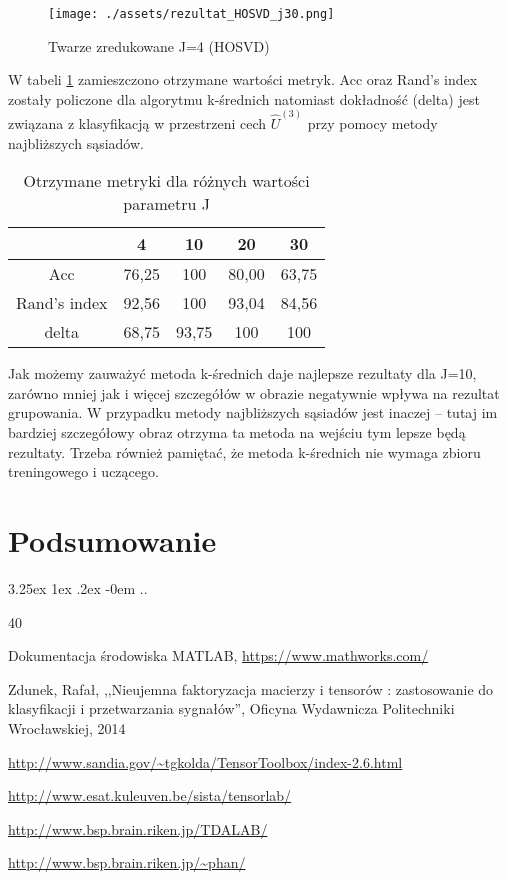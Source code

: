 \documentclass[11pt, a4paper]{article}
\makeatletter
\newcommand{\fbi}{\leavevmode{\parindent=1em\indent}}
\renewcommand\paragraph{\@startsection{paragraph}{5}{\z@}
  {3.25ex \@plus1ex \@minus.2ex}
  {-0em}
  {\normalfont\normalsize\bfseries}}
\makeatother
\begin{document}
\begin{figure}[H]
	\centering
	\texttt{[image: ./assets/rezultat\_HOSVD\_j30.png]}
	\caption{Twarze zredukowane J=4 (HOSVD)}
	\label{fig:rezultat_HOSVD_j30}
\end{figure}

\fbi
W tabeli \ref{tab:wynikiOgolne} zamieszczono otrzymane wartości metryk. Acc oraz Rand's index zostały policzone dla algorytmu k-średnich natomiast dokładność (delta) jest związana z klasyfikacją w przestrzeni cech $\widehat{U}^{(3)}$ przy pomocy metody najbliższych sąsiadów.

\begin{table}[H]
	\centering
	\caption{Otrzymane metryki dla różnych wartości parametru J}
	\begin{tabular}{|c|c|c|c|c|}
		\hline 
		 & 4 & 10 & 20 & 30 \\ 
		\hline
		Acc & 76,25 & 100 & 80,00 & 63,75 \\
		\hline
		Rand's index & 92,56 & 100 & 93,04 & 84,56 \\
		\hline
		delta & 68,75 & 93,75 & 100 & 100 \\
		\hline
	\end{tabular}
	\label{tab:wynikiOgolne}
\end{table}

\fbi
Jak możemy zauważyć metoda k-średnich daje najlepsze rezultaty dla J=10, zarówno mniej jak i więcej szczegółów w obrazie negatywnie wpływa na rezultat grupowania. W przypadku metody najbliższych sąsiadów jest inaczej -- tutaj im bardziej szczegółowy obraz otrzyma ta metoda na wejściu tym lepsze będą rezultaty. Trzeba również pamiętać, że metoda k-średnich nie wymaga zbioru treningowego i uczącego.

\section{Podsumowanie}
\paragraph{}
..

\newpage
\begin{thebibliography}{40}

Dokumentacja środowiska MATLAB,
\url{https://www.mathworks.com/}

Zdunek, Rafał, ,,Nieujemna faktoryzacja macierzy i tensorów : zastosowanie do klasyfikacji i przetwarzania sygnałów'', Oficyna Wydawnicza Politechniki Wrocławskiej, 2014

\url{http://www.sandia.gov/~tgkolda/TensorToolbox/index-2.6.html}

\url{http://www.esat.kuleuven.be/sista/tensorlab/}

\url{http://www.bsp.brain.riken.jp/TDALAB/}

\url{http://www.bsp.brain.riken.jp/~phan/}

\end{thebibliography}
\end{document}
